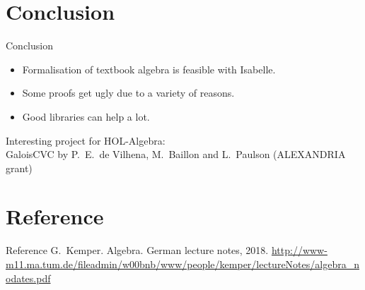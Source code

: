 \documentclass[%
	sans,
	12pt,
]{beamer}
\begin{document}
\section{Conclusion}
\begin{frame}{Conclusion}
\begin{itemize}
\item Formalisation of textbook algebra is feasible with Isabelle.\pause
\item Some proofs get ugly due to a variety of reasons.\pause
\item Good libraries can help a lot.\pause\\[6mm] %
\end{itemize}
Interesting project for HOL-Algebra:\\[2mm]
GaloisCVC by P.\ E.\ de Vilhena, M.\ Baillon and L.\ Paulson (ALEXANDRIA grant)
\end{frame}

\section{Reference}
\begin{frame}{Reference}
	G.\ Kemper. Algebra. German lecture notes, 2018. \url{http://www-m11.ma.tum.de/fileadmin/w00bnb/www/people/kemper/lectureNotes/algebra\_nodates.pdf} 
\end{frame}
\end{document}
